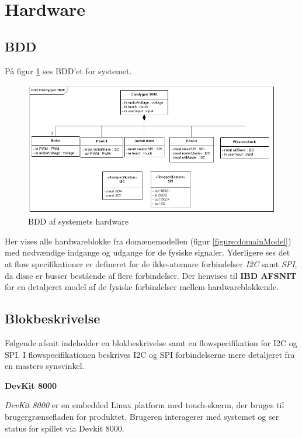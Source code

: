 \section{Hardware}

\subsection{BDD}
\label{afsnit:BDD}
På figur \ref{figure:bddDiagram} ses BDD'et for systemet.

\begin{figure}[H]
	\centering
	\includegraphics[width=\textwidth]{SystemArkitektur/images/BDD_overordnet.PNG}
	\caption{BDD af systemets hardware}
	\label{figure:bddDiagram}
\end{figure}

Her vises alle hardwareblokke fra domænemodellen (figur \ref{figure:domainModel}) med nødvændige indgange og udgange for de fysiske signaler. Yderligere ses det at flow specifikationer er defineret for de ikke-atomare forbindelser \textit{I2C} samt \textit{SPI}, da disse er busser bestående af flere forbindelser. Der henvises til \textbf{IBD AFSNIT} for en detaljeret model af de fysiske forbindelser mellem hardwareblokkende.

\subsection{Blokbeskrivelse}
Følgende afsnit indeholder en blokbeskrivelse samt en flowspecifikation for I2C og SPI. I flowspecifikationen beskrives I2C og SPI forbindelserne mere detaljeret fra en masters synsvinkel. \newline

\noindent \textbf{DevKit 8000} \par
\noindent \textit{DevKit 8000} er en embedded Linux platform med touch-skærm, der bruges til brugergrænsefladen for produktet. Brugeren interagerer med systemet og ser status for spillet via Devkit 8000. 


